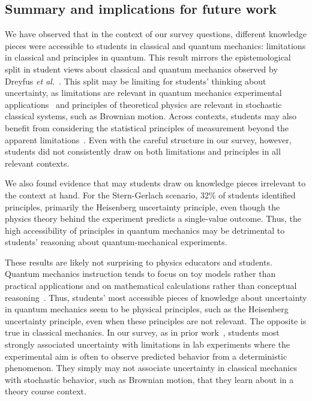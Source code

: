 \documentclass[english,aps,prstper,reprint,showpacs,longbibliography,superscriptaddress,nofootinbib]{revtex4-2}
\begin{document}
\subsection{Summary and implications for future work}

We have observed that in the context of our survey questions, different knowledge pieces were accessible to students in classical and quantum mechanics: limitations in classical and principles in quantum. This result mirrors the epistemological split in student views about classical and quantum mechanics observed by Dreyfus \textit{et al.}~\cite{Dreyfus2019}. This split may be limiting for students' thinking about uncertainty, as limitations are relevant in quantum mechanics experimental applications~\cite{Fox2020} and principles of theoretical physics are relevant in stochastic classical systems, such as Brownian motion. Across contexts, students may also benefit from considering the statistical principles of measurement beyond the apparent limitations~\cite{Evangelinos1999,Evangelinos2002,Allie2003,Pillay2008,Buffler2008}. Even with the careful structure in our survey, however, students did not consistently draw on both limitations and  principles in all relevant contexts.

We also found evidence that may students draw on knowledge pieces irrelevant to the context at hand. For the Stern-Gerlach scenario, 32\% of students identified principles, primarily the Heisenberg uncertainty principle, even though the physics theory behind the experiment predicts a single-value outcome. Thus, the high accessibility of principles in quantum mechanics may be detrimental to students' reasoning about quantum-mechanical experiments.

These results are likely not surprising to physics educators and students. Quantum mechanics instruction tends to focus on toy models rather than practical applications and on mathematical calculations rather than conceptual reasoning~\cite{Johansson2018}. Thus, students' most accessible pieces of knowledge about uncertainty in quantum mechanics seem to be physical principles, such as the Heisenberg uncertainty principle, even when these principles are not relevant. %
The opposite is true in classical mechanics. In our survey, as in prior work~\cite{Sere1993,Holmes2015}, students most strongly associated uncertainty with limitations in lab experiments where the experimental aim is often to observe predicted behavior from a deterministic phenomenon. They simply may not associate uncertainty in classical mechanics with stochastic behavior, such as Brownian motion, that they learn about in a theory course context.
\end{document}
